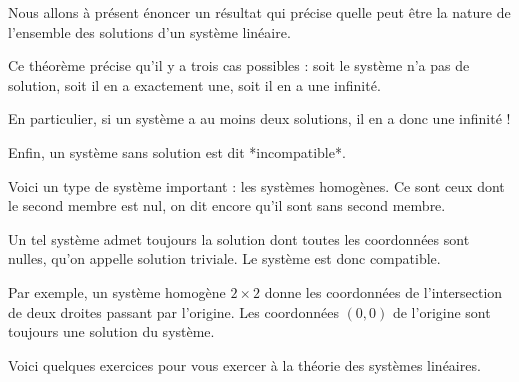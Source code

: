 \diapo

Nous allons à présent énoncer un résultat qui précise quelle peut être la nature de l'ensemble des solutions d'un système linéaire.

Ce théorème précise qu'il y a trois cas possibles : soit le système n'a pas de solution, soit il en a exactement une, soit il en a une infinité.

\change

En particulier, si un système a au moins deux solutions, il en a donc une infinité !

\change

Enfin, un système sans solution est dit *incompatible*.


\diapo

Voici un type de système important : les systèmes homogènes. Ce sont ceux dont le second membre est nul, on dit encore qu'il sont sans second membre.


\change

Un tel système admet toujours la solution dont toutes les coordonnées sont nulles, qu'on appelle solution triviale. Le système est donc compatible.

Par exemple, un système homogène $2\times 2$ donne les coordonnées de l'intersection de deux droites passant par l'origine. Les coordonnées $(0,0)$ de l'origine sont toujours une solution du système.

\diapo

Voici quelques exercices pour vous exercer à la théorie des systèmes linéaires.




